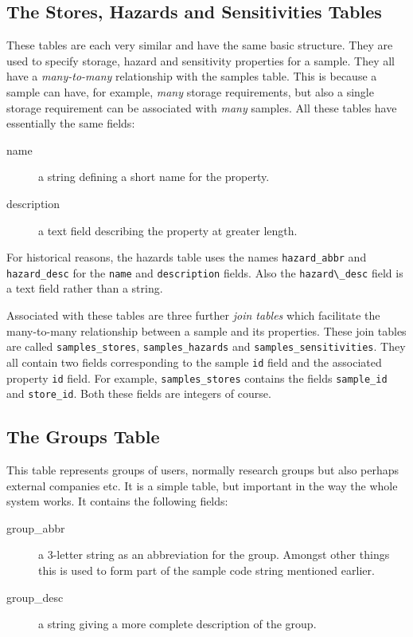 \documentclass[12pt,twoside]{article}
\begin{document}
\subsection{The Stores, Hazards and Sensitivities Tables}
These tables are each very similar and have the same basic structure.
They are used to specify storage, hazard and sensitivity properties
for a sample. They all have a \emph{many-to-many} relationship with
the samples table. This is because a sample can have, for example,
\emph{many} storage requirements, but also a single storage requirement
can be associated with \emph{many} samples.
All these tables have essentially the same fields:
\begin{description}
\item[name]
a string defining a short name for the property.
\item[description]
a text field describing the property at greater length.
\end{description}
For historical reasons, the hazards table uses the names
\verb=hazard_abbr= and \verb=hazard_desc= for the \verb=name= and
\verb=description= fields. Also the \verb=hazard\_desc= field is a text
field rather than a string.

Associated with these tables are three further \emph{join tables} which
facilitate the many-to-many relationship between a sample and its
properties. These join tables are called \verb=samples_stores=,
\verb=samples_hazards= and \verb=samples_sensitivities=. They all contain
two fields corresponding to the sample \verb=id= field and the associated
property \verb=id= field. For example, \verb=samples_stores= contains the
fields \verb=sample_id= and \verb=store_id=. Both these fields are integers
of course.

\subsection{The Groups Table}
This table represents groups of users, normally research groups but also
perhaps external companies etc.
It is a simple table, but important in the way the whole system works.
It contains the following fields:

\begin{description}
\item[group\_abbr]
a 3-letter string as an abbreviation for the group. Amongst other things
this is used to form part of the sample code string mentioned earlier.
\item[group\_desc]
a string giving a more complete description of the group.
\end{description}
\end{document}
